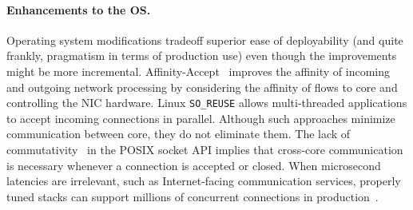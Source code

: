 \paragraph{Enhancements to the OS.}

Operating system modifications tradeoff superior ease of deployability
(and quite frankly, pragmatism in terms of production use) even though
the improvements might be more incremental.
Affinity-Accept~\cite{DBLP:conf/eurosys/PesterevSZM12} improves the
affinity of incoming and outgoing network processing by considering
the affinity of flows to core and controlling the NIC hardware.  Linux
\texttt{SO\_REUSE} allows multi-threaded applications to accept
incoming connections in parallel.  Although such approaches minimize
communication between core, they do not eliminate them.  The lack of
commutativity~\cite{DBLP:conf/sosp/ClementsKZMK13} in the POSIX socket
API implies that cross-core communication is necessary whenever a
connection is accepted or closed.  When microsecond latencies are
irrelevant, such as Internet-facing communication services, properly
tuned stacks can support millions of concurrent connections in
production~\cite{whatsapp-2mil}.  
